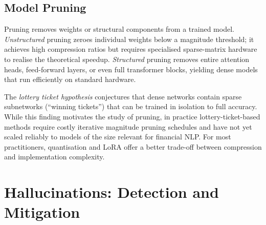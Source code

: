 \begin{deepdive}
\subsection{Model Pruning}
\label{sec:distillation-pruning}

Pruning removes weights or structural components from a trained model.
\emph{Unstructured} pruning zeroes individual weights below a magnitude threshold;
it achieves high compression ratios but requires specialised sparse-matrix hardware
to realise the theoretical speedup.  \emph{Structured} pruning removes entire
attention heads, feed-forward layers, or even full transformer blocks, yielding dense
models that run efficiently on standard hardware.

The \emph{lottery ticket hypothesis} \citep{frankle2019lottery} conjectures that
dense networks contain sparse subnetworks (``winning tickets'') that can be trained in
isolation to full accuracy.  While this finding motivates the study of pruning, in
practice lottery-ticket-based methods require costly iterative magnitude pruning
schedules and have not yet scaled reliably to models of the size relevant for financial
NLP.  For most practitioners, quantisation and LoRA offer a better trade-off between
compression and implementation complexity.

\end{deepdive}

\section{Hallucinations: Detection and Mitigation}
\label{sec:hallucinations}

